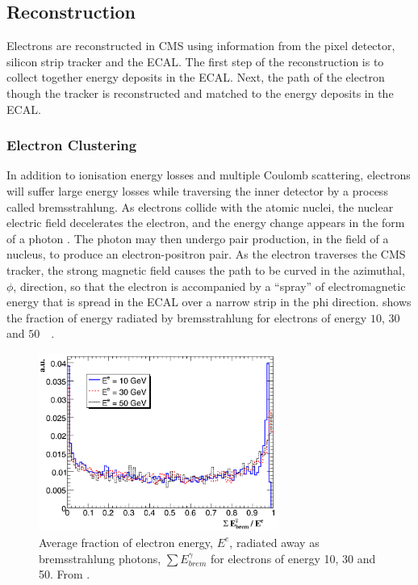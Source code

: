 \subsection{Reconstruction}
Electrons are reconstructed in CMS using information from the pixel detector,
silicon strip tracker and the ECAL.  The first step of the reconstruction is to
collect together energy deposits in the ECAL. Next, the path of the electron
though the tracker is reconstructed and matched to the energy deposits in the
ECAL\cite{baffioni2007electron,adam2009electron}.

\subsubsection{Electron Clustering}

In addition to ionisation energy losses and multiple Coulomb scattering,
electrons will suffer large energy losses while traversing the inner detector by
a process called bremsstrahlung.  As electrons collide with the atomic nuclei,
the nuclear electric field decelerates the electron, and the energy change
appears in the form of a photon \cite{perkins2000introduction}.  The photon may
then undergo pair production, in the field of a nucleus, to produce an
electron-positron pair.  As the electron traverses the CMS tracker, the strong
magnetic field causes the path to be curved in the azimuthal, $\phi$, direction,
so that the electron is accompanied by a ``spray'' of electromagnetic energy
that is spread in the ECAL over a narrow strip in the phi direction. 
 shows the fraction of energy radiated by bremsstrahlung for
electrons of energy $10$, $30$ and \unit{$50$}{\GeV}
\cite{baffioni2007electron}.

\begin{figure}[htbp]
  \centering
  \includegraphics[width=0.7\textwidth]{brem}
  \caption{Average fraction of electron energy, $E^{e}$, radiated away as bremsstrahlung
photons, $\sum E_{brem}^{\gamma}$ for electrons of energy 10, 30 and
\unit{50}{\GeV}. From \cite{baffioni2007electron}. } 
\label{fig:brem}
\end{figure}

